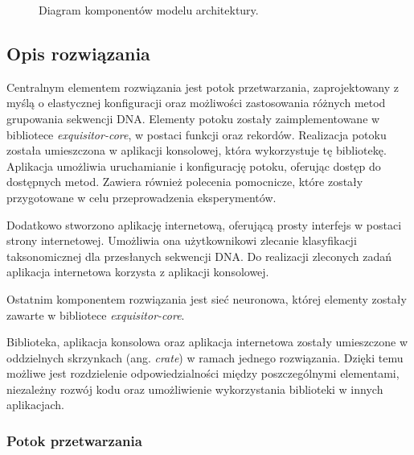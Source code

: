         \begin{figure}
            \begin{center}
                
            \end{center}
            \caption{
                Diagram komponentów modelu architektury.
            }\label{Picture:App:C4:Container}
        \end{figure}

    \subsection{Opis rozwiązania}

    Centralnym elementem rozwiązania jest potok przetwarzania, zaprojektowany z myślą o elastycznej konfiguracji oraz możliwości zastosowania różnych metod grupowania sekwencji DNA. Elementy potoku zostały zaimplementowane w bibliotece \textit{exquisitor-core}, w postaci funkcji oraz rekordów. Realizacja potoku została umieszczona w aplikacji konsolowej, która wykorzystuje tę bibliotekę. Aplikacja umożliwia uruchamianie i konfigurację potoku, oferując dostęp do dostępnych metod. Zawiera również polecenia pomocnicze, które zostały przygotowane w celu przeprowadzenia eksperymentów.

        Dodatkowo stworzono aplikację internetową, oferującą prosty interfejs w postaci strony internetowej. Umożliwia ona użytkownikowi zlecanie klasyfikacji taksonomicznej dla przesłanych sekwencji DNA. Do realizacji zleconych zadań aplikacja internetowa korzysta z aplikacji konsolowej.

        Ostatnim komponentem rozwiązania jest sieć neuronowa, której elementy zostały zawarte w bibliotece \textit{exquisitor-core}. 

        Biblioteka, aplikacja konsolowa oraz aplikacja internetowa zostały umieszczone w oddzielnych skrzynkach (ang. \textit{crate}) w ramach jednego rozwiązania. Dzięki temu możliwe jest rozdzielenie odpowiedzialności między poszczególnymi elementami, niezależny rozwój kodu oraz umożliwienie wykorzystania biblioteki w innych aplikacjach.


        \subsubsection{Potok przetwarzania}

